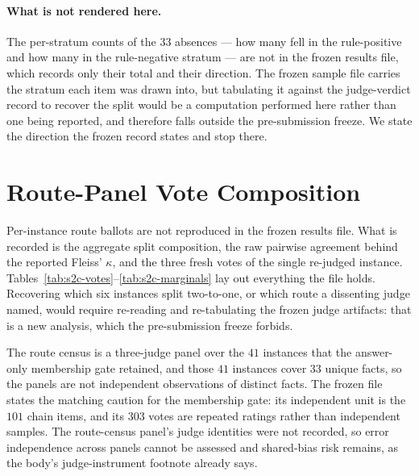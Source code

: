 \documentclass[letterpaper]{article}
\begin{document}
\paragraph{What is not rendered here.}
The per-stratum counts of the \(33\) absences --- how many fell in the
rule-positive and how many in the rule-negative stratum --- are not in the
frozen results file, which records only their total and their direction.  The
frozen sample file carries the stratum each item was drawn into, but tabulating
it against the judge-verdict record to recover the split would be a computation
performed here rather than one being reported, and therefore falls outside the
pre-submission freeze.  We state the direction the frozen record states and stop
there.

\section{Route-Panel Vote Composition}
Per-instance route ballots are not reproduced in the frozen results file.  What is
recorded is the aggregate split composition, the raw pairwise agreement behind the
reported Fleiss' \(\kappa\), and the three fresh votes of the single re-judged
instance.  Tables~\ref{tab:s2c-votes}--\ref{tab:s2c-marginals} lay out everything
the file holds.  Recovering which six instances split two-to-one, or which route
a dissenting judge named, would require re-reading and re-tabulating the frozen
judge artifacts: that is a new analysis, which the pre-submission freeze forbids.

The route census is a three-judge panel over the \(41\) instances that the
answer-only membership gate retained, and those \(41\) instances cover \(33\)
unique facts, so the panels are not independent observations of distinct facts.
The frozen file states the matching caution for the membership gate: its
independent unit is the \(101\) chain items, and its \(303\) votes are repeated
ratings rather than independent samples.  The route-census panel's judge
identities were not recorded, so error independence across panels cannot be
assessed and shared-bias risk remains, as the body's judge-instrument footnote
already says.
\end{document}
